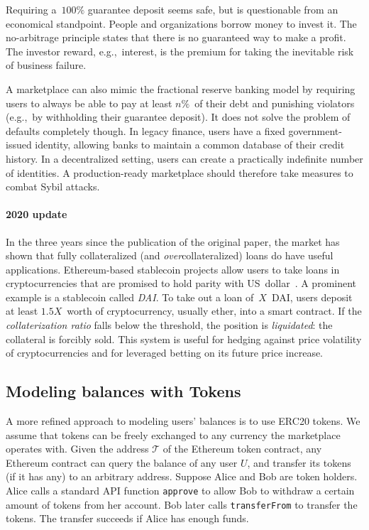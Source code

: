 Requiring a~$100\%$ guarantee deposit seems safe, but is questionable from an economical standpoint.
People and organizations borrow money to invest it.
The no-arbitrage principle states that there is no guaranteed way to make a profit.
The investor reward, e.g.,~interest, is the premium for taking the inevitable risk of business failure.

A marketplace can also mimic the fractional reserve banking model by requiring users to always be able to pay at least $n\%$~of their debt and punishing violators (e.g.,~by withholding their guarantee deposit).
It does not solve the problem of defaults completely though.
In legacy finance, users have a fixed government-issued identity, allowing banks to maintain a common database of their credit history.
In a decentralized setting, users can create a practically indefinite number of identities.
A production-ready marketplace should therefore take measures to combat Sybil attacks.

\paragraph{2020 update}
In the three years since the publication of the original paper, the market has shown that fully collateralized (and \textit{over}collateralized) loans do have useful applications.
Ethereum-based stablecoin projects allow users to take loans in cryptocurrencies that are promised to hold parity with US~dollar~\cite{Mita2019}.
A prominent example is a stablecoin called \textit{DAI}.
To take out a loan of~$X$~DAI, users deposit at least $1.5X$~worth of cryptocurrency, usually ether, into a smart contract.
If the \textit{collaterization ratio} falls below the threshold, the position is \textit{liquidated}: the collateral is forcibly sold.
This system is useful for hedging against price volatility of cryptocurrencies and for leveraged betting on its future price increase.


\subsection{Modeling balances with Tokens}

A more refined approach to modeling users' balances is to use ERC20 tokens.
We assume that tokens can be freely exchanged to any currency the marketplace operates with.
Given the address $\mathcal{T}$ of the Ethereum token contract, any Ethereum contract can query the balance of any user $U$, and transfer its tokens (if it has any) to an arbitrary address.
Suppose Alice and Bob are token holders.
Alice calls a standard API function \texttt{approve} to allow Bob to withdraw a certain amount of tokens from her account.
Bob later calls \texttt{transferFrom} to transfer the tokens.
The transfer succeeds if Alice has enough funds.

